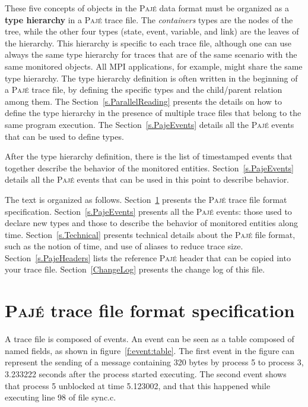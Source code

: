 \documentclass[12pt]{article}
\newcommand{\Paje}{\textsc{Paj\'e}\xspace}
\begin{document}
These five concepts of objects in the \Paje data format must be
organized as a {\bf type hierarchy} in a \Paje trace file. The
\emph{containers} types are the nodes of the tree, while the other
four types (state, event, variable, and link) are the leaves of the
hierarchy. This hierarchy is specific to each trace file, although one
can use always the same type hierarchy for traces that are of the same
scenario with the same monitored objects. All MPI applications, for
example, might share the same type hierarchy. The type hierarchy
definition is often written in the beginning of a \Paje trace file, by
defining the specific types and the child/parent relation among
them. The Section~\ref{s.ParallelReading} presents the details on how
to define the type hierarchy in the presence of multiple trace files
that belong to the same program execution.  The
Section~\ref{s.PajeEvents} details all the \Paje events that can be
used to define types.

After the type hierarchy definition, there is the list of timestamped
events that together describe the behavior of the monitored entities.
Section~\ref{s.PajeEvents} details all the \Paje events that can be
used in this point to describe behavior.

The text is organized as follows. Section~\ref{s.Specification}
presents the \Paje trace file format
specification. Section~\ref{s.PajeEvents} presents all the \Paje
events: those used to declare new types and those to describe the
behavior of monitored entities along time. Section~\ref{s.Technical}
presents technical details about the \Paje file format, such as the
notion of time, and use of aliases to reduce trace size.
Section~\ref{s.PajeHeaders} lists the reference \Paje header that can
be copied into your trace file. Section~\ref{ChangeLog} presents the
change log of this file.

\section{\Paje trace file format specification}
\label{s.Specification}

A trace file is composed of events.  An event can be seen as a table
composed of named fields, as shown in figure~\ref{f:event:table}.  The
first event in the figure can represent the sending of a message
containing 320 bytes by process 5 to process 3, 3.233222
seconds after the process started executing.  The second event shows
that process 5 unblocked at time 5.123002, and that this happened
while executing line 98 of file sync.c. 
\end{document}

